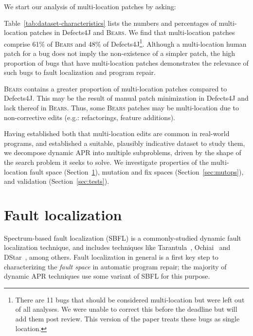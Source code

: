 \documentclass[10pt, conference]{IEEEtran}
\newcommand\bears{\textsc{Bears}\xspace}
\begin{document}
We start our analysis of multi-location patches by asking:

Table~\ref{tab:dataset-characteristics} lists the numbers and percentages of
multi-location patches in Defects4J and \bears. 
We find that multi-location patches comprise 61\% of \bears and 48\% of 
Defects4J\footnote{There are 11 bugs that should be considered multi-location but were left 
out of all analyses. We were unable to correct this before the deadline but will add them 
post review. This version of the paper treats these bugs as single location.}.
Although a multi-location human patch for a bug does not imply the 
non-existence of a simpler patch, the high proportion of bugs that have 
multi-location patches demonstrates the relevance of such bugs to fault localization and
program repair. 

\bears contains a greater proportion of 
multi-location patches compared to Defects4J. This may be the 
result of manual patch minimization in Defects4J
and lack thereof in \bears.
Thus, some \bears patches may be multi-location due to
non-corrective edits (e.g.: refactorings, feature additions).

Having established both that multi-location edits are common in real-world
programs, and established a suitable, plausibly indicative dataset to study
them, we decompose dynamic APR into multiple subproblems, driven by the
shape of the search problem it seeks to solve. We 
investigate properties of the multi-location fault space (Section~\ref{secFL}),
mutation and fix spaces (Section~\ref{sec:mutops}), and validation
(Section~\ref{sec:tests}). 

\section{Fault localization} \label{secFL}


Spectrum-based fault localization (SBFL) is a commonly-studied dynamic
fault localization technique, and includes techniques like Tarantula~\cite{tarantula},
Ochiai~\cite{ochiai} and DStar~\cite{wong2013dstar}, among others.
Fault localization in general is a first key step to characterizing the
\emph{fault space} in automatic program repair; the majority of dynamic APR
techniques use some variant of SBFL for this purpose.
\end{document}
